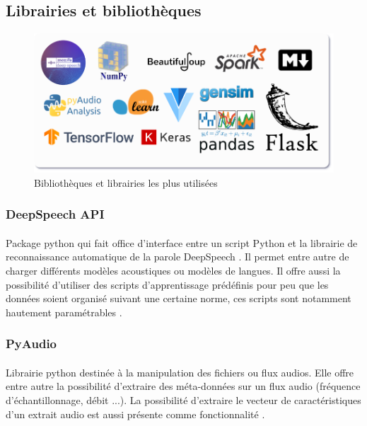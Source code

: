 	\subsection{Librairies et bibliothèques}
	\begin{figure}[H] 
		\centering
		\includegraphics[width=0.9\linewidth]{images/implementation/libs_frams.png}
		\caption{Bibliothèques et librairies les plus utilisées}
		\label{fig:libs_frams}
	\end{figure}
		\subsubsection*{DeepSpeech API}
		\paragraph{}
		Package python qui fait office d'interface entre un script Python et la librairie de reconnaissance automatique de la parole DeepSpeech \cite{deepspeech_paper}. Il permet entre autre de charger différents modèles acoustiques ou modèles de langues. Il offre aussi la possibilité d'utiliser des scripts d'apprentissage prédéfinis pour peu que les données soient organisé suivant une certaine norme, ces scripts sont notamment hautement paramétrables \cite{deepseech_github}.
		
		\subsubsection*{PyAudio}
		\paragraph{}
		Librairie python destinée à la manipulation des fichiers ou flux audios. Elle offre entre autre la possibilité d'extraire des méta-données sur un flux audio (fréquence d'échantillonnage, débit ...). La possibilité d'extraire le vecteur de caractéristiques d'un extrait audio est aussi présente comme fonctionnalité \cite{pyaudio}.
		
